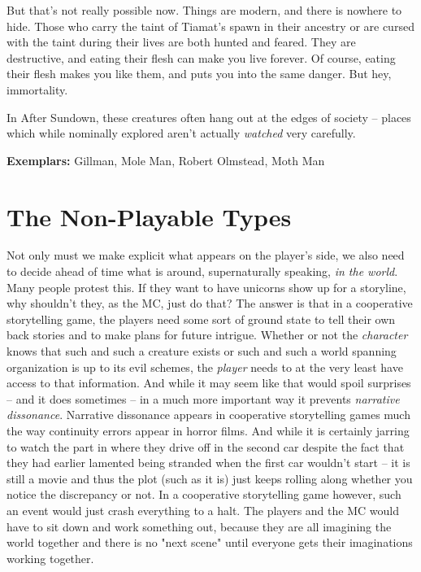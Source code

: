 But that's not really possible now. Things are modern, and there is nowhere to hide. Those who carry the taint of Tiamat's spawn in their ancestry or are cursed with the taint during their lives are both hunted and feared. They are destructive, and eating their flesh can make you live forever. Of course, eating their flesh makes you like them, and puts you into the same danger. But hey, immortality.

In After Sundown, these creatures often hang out at the edges of society -- places which while nominally explored aren't actually \textit{watched} very carefully. 

\textbf{Exemplars:} Gillman, Mole Man, Robert Olmstead, Moth Man

\section{The Non-Playable Types}

\hspace{\parindent} Not only must we make explicit what appears on the player's side, we also need to decide ahead of time what is around, supernaturally speaking, \textit{in the world}. Many people protest this. If they want to have unicorns show up for a storyline, why shouldn't they, as the MC, just do that? The answer is that in a cooperative storytelling game, the players need some sort of ground state to tell their own back stories and to make plans for future intrigue. Whether or not the \textit{character} knows that such and such a creature exists or such and such a world spanning organization is up to its evil schemes, the \textit{player} needs to at the very least have access to that information. And while it may seem like that would spoil surprises -- and it does sometimes -- in a much more important way it prevents \textit{narrative dissonance}. Narrative dissonance appears in cooperative storytelling games much the way continuity errors appear in horror films. And while it is certainly jarring to watch the part in  where they drive off in the second car despite the fact that they had earlier lamented being stranded when the first car wouldn't start -- it is still a movie and thus the plot (such as it is) just keeps rolling along whether you notice the discrepancy or not. In a cooperative storytelling game however, such an event would just crash everything to a halt. The players and the MC would have to sit down and work something out, because they are all imagining the world together and there is no "next scene" until everyone gets their imaginations working together.

